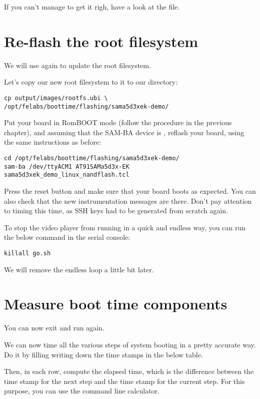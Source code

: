 If you can't manage to get it righ, have a look at the
 file.
 
\section{Re-flash the root filesystem}

We will use  again to update the root filesystem.

Let's copy our new root filesystem to it to our  directory:

\begin{verbatim}
cp output/images/rootfs.ubi \
/opt/felabs/boottime/flashing/sama5d3xek-demo/ 
\end{verbatim}

Put your board in RomBOOT mode (follow the procedure in the previous
chapter), and assuming that the SAM-BA device is \code{/dev/ttyACM1},
reflash your board, using the same instructions as before:

\begin{verbatim}
cd /opt/felabs/boottime/flashing/sama5d3xek-demo/ 
sam-ba /dev/ttyACM1 AT91SAMa5d3x-EK sama5d3xek_demo_linux_nandflash.tcl
\end{verbatim}

Press the reset button and make sure that your board boots as
expected. You can also check that the new instrumentation messages are
there. Don't pay attention to timing this time, as SSH keys had to be
generated from scratch again.

To stop the video player from running in a quick and endless way,
you can run the below command in the serial console:

\begin{verbatim}
killall go.sh
\end{verbatim}

We will remove the endless loop a little bit later.

\section{Measure boot time components}

You can now exit  and run  again.

We can now time all the various steps of system booting in a pretty
accurate way. Do it by filling writing down the time stamps in the below
table.

Then, in each row, compute the elapsed time, which is the difference
between the time stamp for the next step and the time stamp for the current step.
For this purpose, you can use the \code{bc -l} command line calculator.

